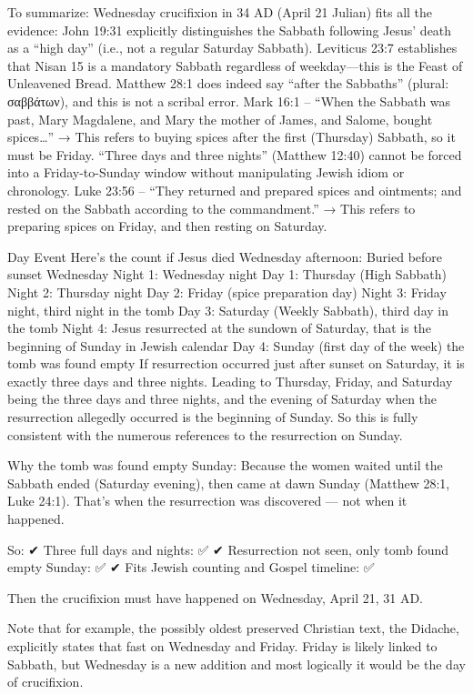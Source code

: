 To summarize: Wednesday crucifixion in 34 AD (April 21 Julian) fits all the evidence: John 19:31 explicitly distinguishes the Sabbath following Jesus' death as a ``high day'' (i.e., not a regular Saturday Sabbath).
Leviticus 23:7 establishes that Nisan 15 is a mandatory Sabbath regardless of weekday---this is the Feast of Unleavened Bread.
Matthew 28:1 does indeed say ``after the Sabbaths'' (plural: σαββάτων), and this is not a scribal error.
Mark 16:1 -- ``When the Sabbath was past, Mary Magdalene, and Mary the mother of James, and Salome, bought spices\ldots'' → This refers to buying spices after the first (Thursday) Sabbath, so it must be Friday.
``Three days and three nights'' (Matthew 12:40) cannot be forced into a Friday-to-Sunday window without manipulating Jewish idiom or chronology.
Luke 23:56 -- ``They returned and prepared spices and ointments; and rested on the Sabbath according to the commandment.'' → This refers to preparing spices on Friday, and then resting on Saturday.

Day Event Here's the count if Jesus died Wednesday afternoon: Buried before sunset Wednesday Night 1: Wednesday night Day 1: Thursday (High Sabbath) Night 2: Thursday night Day 2: Friday (spice preparation day) Night 3: Friday night, third night in the tomb Day 3: Saturday (Weekly Sabbath), third day in the tomb Night 4: Jesus resurrected at the sundown of Saturday, that is the beginning of Sunday in Jewish calendar Day 4: Sunday (first day of the week) the tomb was found empty If resurrection occurred just after sunset on Saturday, it is exactly three days and three nights.
Leading to Thursday, Friday, and Saturday being the three days and three nights, and the evening of Saturday when the resurrection allegedly occurred is the beginning of Sunday.
So this is fully consistent with the numerous references to the resurrection on Sunday.

Why the tomb was found empty Sunday: Because the women waited until the Sabbath ended (Saturday evening), then came at dawn Sunday (Matthew 28:1, Luke 24:1).
That's when the resurrection was discovered --- not when it happened.

So: ✔ Three full days and nights: ✅ ✔ Resurrection not seen, only tomb found empty Sunday: ✅ ✔ Fits Jewish counting and Gospel timeline: ✅

Then the crucifixion must have happened on Wednesday, April 21, 31 AD.

Note that for example, the possibly oldest preserved Christian text, the Didache, explicitly states that fast on Wednesday and Friday.
Friday is likely linked to Sabbath, but Wednesday is a new addition and most logically it would be the day of crucifixion.

